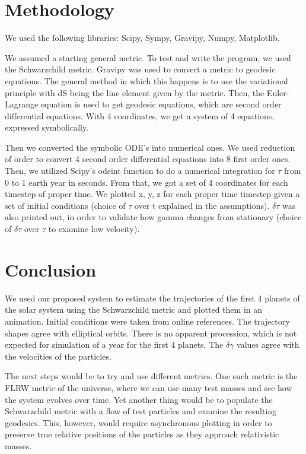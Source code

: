 \documentclass[12pt]{article}
\begin{document}
\section*{Methodology}
We used the following libraries: Scipy, Sympy, Gravipy, Numpy, Matplotlib.

We assumed a starting general metric. To test and write the program, we used the Schwarzchild metric. Gravipy was used to convert a metric to geodesic equations. The general method in which this happens is to use the variational principle with dS being the line element given by the metric. Then, the Euler-Lagrange equation is used to get geodesic equations, which are second order differential equations. With 4 coordinates, we get a system of 4 equations, expressed symbolically.

Then we converted the symbolic ODE's into numerical ones. We used reduction of order to convert 4 second order differential equations into 8 first order ones. Then, we utilized Scipy's odeint function to do a numerical integration for $\tau$ from 0 to 1 earth year in seconds. From that, we got a set of 4 coordinates for each timestep of proper time. We plotted x, y, z for each proper time timestep given a set of initial conditions (choice of $\tau$ over t explained in the assumptions). $\delta \tau$ was also printed out, in order to validate how gamma changes from stationary (choice of $\delta \tau$ over $\tau$ to examine low velocity).

\section*{Conclusion}
We used our proposed system to estimate the trajectories of the first 4 planets of the solar system using the Schwarzchild metric and plotted them in an animation. Initial conditions were taken from online references. The trajectory shapes agree with elliptical orbits. There is no apparent procession, which is not expected for simulation of a year for the first 4 planets. The $\delta \gamma$ values agree with the velocities of the particles.

The next steps would be to try and use different metrics. One such metric is the FLRW metric of the universe, where we can use many test masses and see how the system evolves over time. Yet another thing would be to populate the Schwarzchild metric with a flow of test particles and examine the resulting geodesics. This, however, would require asynchronous plotting in order to preserve true relative positions of the particles as they approach relativistic masses.
\end{document}
